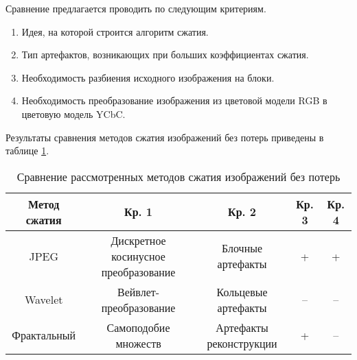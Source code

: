 Сравнение предлагается проводить по следующим критериям.
\begin{enumerate}
    \item Идея, на которой строится алгоритм сжатия.
    \item Тип артефактов, возникающих при больших коэффициентах сжатия.
    \item Необходимость разбиения исходного изображения на блоки.
    \item Необходимость преобразование изображения из цветовой модели RGB в цветовую модель YCbC.
\end{enumerate}

Результаты сравнения методов сжатия изображений без потерь приведены в таблице \ref{tbl:compare_realizations2}.
\begin{table}[H]
    \centering
	\caption{Сравнение рассмотренных методов сжатия изображений без потерь}
    \label{tbl:compare_realizations2}
	\begin{tabular}{|c|c|c|c|c|}
        \hline
        \textbf{Метод сжатия} & \textbf{Кр. 1} & \textbf{Кр. 2} & \textbf{Кр. 3} & \textbf{Кр. 4}
        \\ \hline
        JPEG        & \begin{minipage}[t]{5.5cm}\centering Дискретное косинусное \newline преобразование \end{minipage} & \begin{minipage}[t]{3.1cm}\centering Блочные \newline артефакты \newline \end{minipage} & + & + \\ \hline
        Wavelet     & Вейвлет-преобразование & \begin{minipage}[t]{3.1cm}\centering Кольцевые \newline артефакты \newline \end{minipage}     & -- & --  \\ \hline 
        Фрактальный & Самоподобие множеств   & \begin{minipage}[t]{3.1cm}\centering Артефакты \newline реконструкции \newline \end{minipage} & +  & -- \\ \hline
    \end{tabular}
\end{table}

